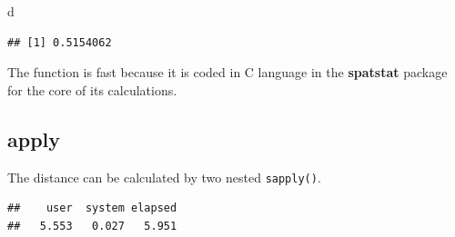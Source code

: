 \documentclass[
  12pt,
  american,
  a4paper,
  extrafontsizes,onecolumn,openright
  ]{memoir}
\newenvironment{Shaded}{\begin{snugshade}}{\end{snugshade}}
\newcommand{\ControlFlowTok}[1]{\textcolor[rgb]{0.13,0.29,0.53}{\textbf{#1}}}
\newcommand{\DecValTok}[1]{\textcolor[rgb]{0.00,0.00,0.81}{#1}}
\newcommand{\FunctionTok}[1]{\textcolor[rgb]{0.00,0.00,0.00}{#1}}
\newcommand{\NormalTok}[1]{#1}
\newcommand{\OtherTok}[1]{\textcolor[rgb]{0.56,0.35,0.01}{#1}}
\newcommand{\SpecialCharTok}[1]{\textcolor[rgb]{0.00,0.00,0.00}{#1}}
\begin{document}
\begin{Shaded}
\begin{Highlighting}[]
\NormalTok{d}
\end{Highlighting}
\end{Shaded}

\begin{verbatim}
## [1] 0.5154062
\end{verbatim}

\normalsize

The function is fast because it is coded in C language in the \textbf{spatstat} package for the core of its calculations.

\hypertarget{apply}{%
\subsection{apply}\label{apply}}

The distance can be calculated by two nested \texttt{sapply()}.

\scriptsize

\begin{Shaded}
\end{Shaded}

\begin{verbatim}
##    user  system elapsed 
##   5.553   0.027   5.951
\end{verbatim}
\end{document}
